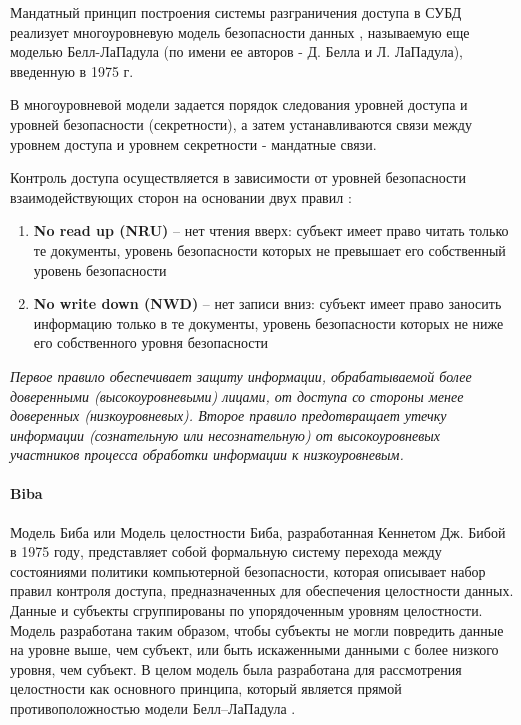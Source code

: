 Мандатный принцип построения системы разграничения доступа в СУБД реализует многоуровневую модель безопасности 
данных \autocite{Skakun}, называемую еще моделью Белл-ЛаПадула (по имени ее авторов - Д. Белла и Л. ЛаПадула), 
введенную в 1975 г.

В многоуровневой модели задается порядок следования уровней доступа и уровней безопасности (секретности), 
а затем устанавливаются связи между уровнем доступа и уровнем секретности - мандатные связи.

Контроль доступа осуществляется в зависимости от уровней безопасности взаимодействующих сторон на 
основании двух правил \autocite{URFULecture10Models}:
\begin{enumerate}
    \item \textbf{No read up (NRU)} – нет чтения вверх: субъект имеет право читать только те документы, 
    уровень безопасности которых не превышает его собственный уровень безопасности

    \item \textbf{No write down (NWD)} – нет записи вниз: субъект имеет право заносить информацию только 
    в те документы, уровень безопасности которых не ниже его собственного уровня безопасности
\end{enumerate}

\textit{Первое правило обеспечивает защиту информации, обрабатываемой более доверенными 
(высокоуровневыми) лицами, от доступа со стороны менее доверенных (низкоуровневых). Второе правило 
предотвращает утечку информации (сознательную или несознательную) от высокоуровневых участников 
процесса обработки информации к низкоуровневым.}

\paragraph{Biba}

Модель Биба или Модель целостности Биба, разработанная Кеннетом Дж. Бибой в 1975 году, представляет собой 
формальную систему перехода между состояниями политики компьютерной безопасности, которая описывает набор 
правил контроля доступа, предназначенных для обеспечения целостности данных. Данные и субъекты сгруппированы 
по упорядоченным уровням целостности. Модель разработана таким образом, чтобы субъекты не могли повредить 
данные на уровне выше, чем субъект, или быть искаженными данными с более низкого уровня, чем субъект. В целом 
модель была разработана для рассмотрения целостности как основного принципа, который является прямой 
противоположностью модели Белл–ЛаПадула \autocite{Biba}.

